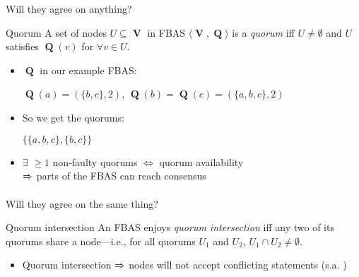 \documentclass{beamer}
\DeclareMathOperator{\V}{\mathbf{V}}
\DeclareMathOperator{\Q}{\mathbf{Q}}
\newcommand{\Arrow}[1][]{$\xRightarrow{\text{#1}}$ }
\begin{document}
\begin{frame}{Will they agree on anything?}

  \begin{block}{Quorum}
    A set of nodes $U \subseteq \V$ in FBAS $\langle \V, \Q \rangle$
    is a \emph{quorum} iff $U \neq \emptyset$ and
    $U$ satisfies $\Q(v)$ for $\forall v \in U$.
  \end{block}

  \begin{itemize}
    \item $\Q$ in our example FBAS:\\
      \vfill
      \begin{center}
        $\Q(a) = (\{b, c\}, 2)$, $\Q(b) = \Q(c) = (\{a, b, c\}, 2)$
      \end{center}
      \vfill
    \item So we get the quorums:\\
      \vfill
      \begin{center}
        $\{\{a,b,c\},\{b,c\}\}$
      \end{center}
      \vfill
    \item $\exists$ $\geq1$ non-faulty quorums $\iff$ \alert{quorum availability} \\
      \Arrow parts of the FBAS can reach consensus
  \end{itemize}
\end{frame}

\begin{frame}{Will they agree on the same thing?}

  \begin{block}{Quorum intersection}
    An FBAS enjoys \emph{quorum intersection} iff any two of
    its quorums share a node—i.e., for all quorums
    $U_{1}$ and $U_{2}$, $U_{1} \cap U_{2} \neq \emptyset$.
  \end{block}
  \begin{itemize}
    \item Quorum intersection \Arrow nodes will not accept conflicting statements
      (s.a. \cite{mazieres2015stellar})
  \end{itemize}
  \vfill
  \vfill
  \vfill
\end{frame}
\end{document}
